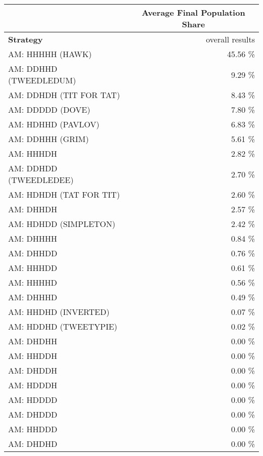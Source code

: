 \begin{tabular}{|l|r|}
\hline
 & \multicolumn{1}{c|}{{\bf Average Final Population Share}} \\
\hline
{\bf Strategy} & overall results\\ \hline
AM: HHHHH (HAWK)             &   45.56 \% \\
AM: DDHHD (TWEEDLEDUM)       &    9.29 \% \\
AM: DDHDH (TIT FOR TAT)      &    8.43 \% \\
AM: DDDDD (DOVE)             &    7.80 \% \\
AM: HDHHD (PAVLOV)           &    6.83 \% \\
AM: DDHHH (GRIM)             &    5.61 \% \\
AM: HHHDH                    &    2.82 \% \\
AM: DDHDD (TWEEDLEDEE)       &    2.70 \% \\
AM: HDHDH (TAT FOR TIT)      &    2.60 \% \\
AM: DHHDH                    &    2.57 \% \\
AM: HDHDD (SIMPLETON)        &    2.42 \% \\
AM: DHHHH                    &    0.84 \% \\
AM: DHHDD                    &    0.76 \% \\
AM: HHHDD                    &    0.61 \% \\
AM: HHHHD                    &    0.56 \% \\
AM: DHHHD                    &    0.49 \% \\
AM: HHDHD (INVERTED)         &    0.07 \% \\
AM: HDDHD (TWEETYPIE)        &    0.02 \% \\
AM: DHDHH                    &    0.00 \% \\
AM: HHDDH                    &    0.00 \% \\
AM: DHDDH                    &    0.00 \% \\
AM: HDDDH                    &    0.00 \% \\
AM: HDDDD                    &    0.00 \% \\
AM: DHDDD                    &    0.00 \% \\
AM: HHDDD                    &    0.00 \% \\
AM: DHDHD                    &    0.00 \% \\
\hline
\end{tabular}
